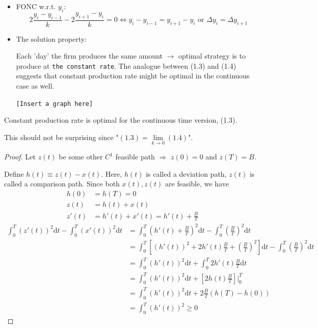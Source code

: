 \documentclass[twoside]{article}
\begin{document}
\begin{itemize}
  \item FONC w.r.t. $y_i$:
  \begin{equation}
    2 \frac{y_i - y_{i-1}}{k} - 2\frac{y_{i+1} - y_{i}}{k} = 0 \iff y_i - y_{i-1} = y_{i+1} - y_{i} \text{ or } \Delta y_i = \Delta y_{i+1}
  \end{equation}
  \item The solution property:

  Each 'day' the firm produces the same amount $\longrightarrow$ optimal strategy is to produce at \texttt{the constant rate}. The analogue between (1.3) and (1.4) suggests that constant production rate might be optimal in the continuous case as well. 

  \begin{center}
    \texttt{[Insert a graph here]}
  \end{center}

\end{itemize}

\begin{claim}
  Constant production rate is optimal for the continuous time version, (1.3).
\end{claim}

\begin{remark}
  This should not be surprising since "$(1.3) = \lim\limits_{k\rightarrow 0} (1.4)$".
\end{remark}

\begin{proof}
  Let $z(t)$ be some other $C^1$ feasible path $\Longrightarrow$ $z(0) = 0$ and $ z(T) = B$.

  Define $h(t) \equiv z(t) - x(t)$. Here, $h(t)$ is called a deviation path, $z(t)$ is called a comparison path. Since both $x(t), z(t)$ are feasible, we have
  $$\begin{aligned}
    h(0) &= h(T) = 0 \\
    z(t) &= h(t) + x(t) \\ 
    z'(t)&= h'(t) + x'(t) = h'(t) + \frac{B}{T}
  \end{aligned}$$
  $$\begin{aligned}
    \int_0^T (z'(t))^2 \mathrm{d}t - \int_0^T (x'(t))^2 \mathrm{d}t &= \int_0^T \left (h'(t)+\frac{B}{T} \right )^2 \mathrm{d}t - \int_0^T \left ( \frac{B}{T} \right )^2 \mathrm{d}t\\
    &= \int_0^T \left [ (h'(t))^2 + 2 h'(t) \frac{B}{T} + (\frac{B}{T})^2 \right ] \mathrm{d}t - \int_0^T \left ( \frac{B}{T} \right )^2 \mathrm{d}t\\
    &= \int_0^T (h'(t))^2  \mathrm{d}t + \int_0^T 2 h'(t) \frac{B}{T} \mathrm{d}t\\
    &= \int_0^T (h'(t))^2  \mathrm{d}t + \left [2 h(t) \frac{B}{T}\right ] {\bigg |}_0^T\\
    &= \int_0^T (h'(t))^2  \mathrm{d}t + 2 \frac{B}{T} (h(T) - h(0) )\\
    &= \int_0^T (h'(t))^2 \geq 0
  \end{aligned}$$
\end{proof}
\end{document}
